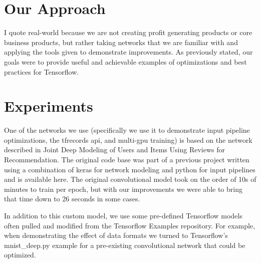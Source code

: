 \documentclass{article}
\begin{document}
\section{Our Approach}
I quote real-world because we are not creating profit generating products or core business products, but rather taking networks that we are familiar with and applying the tools given to demonstrate improvements. As previously stated, our goals were to provide useful and achievable examples of optimizations and best practices for Tensorflow.

\section{Experiments}
One of the networks we use (specifically we use it to demonstrate input pipeline optimizations, the tfrecords api, and multi-gpu training) is based on the network described in Joint Deep Modeling of Users and Items Using Reviews for Recommendation. The original code base was part of a previous project written using a combination of keras for network modeling and python for input pipelines and is available here. The original convolutional model took on the order of 10s of minutes to train per epoch, but with our improvements we were able to bring that time down to 26 seconds in some cases.

In addition to this custom model, we use some pre-defined Tensorflow models often pulled and modified from the Tensorflow Examples repository. For example, when demonstrating the effect of data formats we turned to Tensorflow's mnist\_deep.py example for a pre-existing convolutional network that could be optimized.



\end{document}
